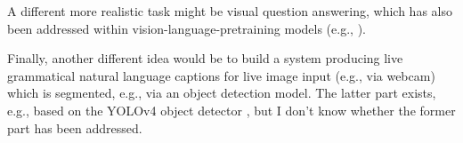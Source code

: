 \documentclass[11pt,letterpaper]{article}
\begin{document}
 A different more realistic task might be visual question answering, which has also been addressed within vision-language-pretraining models (e.g., \cite{lu2019vilbert, nie2020pragmatic}).
 
 Finally, another different idea would be to build a system producing live grammatical natural language captions for live image input (e.g., via webcam) which is segmented, e.g., via an object detection model. The latter part exists, e.g., based on the YOLOv4 object detector \cite{bochkovskiy2020yolov4}, but I don't know whether the former part has been addressed.
 


\end{document}
